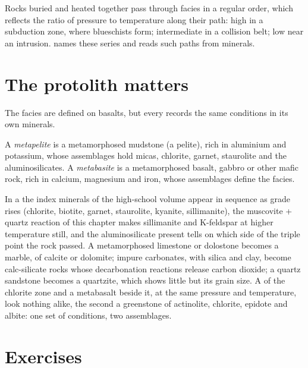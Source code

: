 Rocks buried and heated together pass through facies in a regular order, which
reflects the ratio of pressure to temperature along their path: high in a subduction
zone, where blueschists form; intermediate in a collision belt; low near an intrusion.
 names these series and reads such paths from minerals.

\section{The protolith matters}\label{sec:b2:metamorphic-facies:protoliths}

The facies are defined on basalts, but every  records the same conditions in
its own minerals.

\begin{definition}\label{def:b2:metamorphic-facies:protoliths}
A \emph{metapelite} is a metamorphosed mudstone (a pelite), rich in
aluminium and potassium, whose assemblages hold micas, chlorite, garnet, staurolite and
the aluminosilicates. A \emph{metabasite} is a metamorphosed basalt,
gabbro or other mafic rock, rich in calcium, magnesium and iron, whose assemblages define
the facies.
\end{definition}

In a  the index minerals of the high-school volume appear in sequence as
grade rises (chlorite, biotite, garnet, staurolite, kyanite, sillimanite), the
muscovite + quartz reaction of this chapter makes sillimanite and K-feldspar at higher
temperature still, and the aluminosilicate present tells on which side of the triple
point the rock passed. A metamorphosed limestone or dolostone becomes a marble, of calcite or
dolomite; impure carbonates, with silica and clay, become calc-silicate rocks whose
decarbonation reactions release carbon dioxide; a quartz sandstone becomes a quartzite,
which shows little but its grain size. A  of the chlorite zone and a
metabasalt beside it, at the same pressure and temperature, look nothing alike, the
second a greenstone of actinolite, chlorite, epidote and albite: one set of conditions,
two assemblages.

\section{Exercises}

